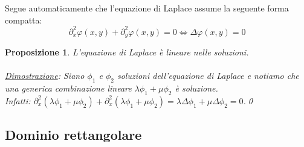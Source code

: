 \documentclass[a4paper,12pt]{report}
\newtheorem{proposizione}{Proposizione}[chapter]
\begin{document}
Segue automaticamente che l'equazione di Laplace assume la seguente forma compatta:
\[\partial_x^2\varphi(x,y)+\partial_y^2\varphi(x,y)=0\iff \Delta\varphi(x,y)=0\]

\begin{proposizione}\label{prop: 4.3}
    L'equazione di Laplace è lineare nelle soluzioni.
    \\
    \\\underline{Dimostrazione}: Siano $\phi_1$ e $\phi_2$ soluzioni dell'equazione di Laplace e notiamo che una generica combinazione lineare $\lambda\phi_1+\mu\phi_2$ è soluzione.
    \\ Infatti: $\partial_x^2(\lambda\phi_1+\mu\phi_2)+\partial_x^2(\lambda\phi_1+\mu\phi_2)=\lambda\Delta\phi_1+\mu\Delta\phi_2=0$.\qed
\end{proposizione}


\newpage

\subsection{Dominio rettangolare}
\end{document}
